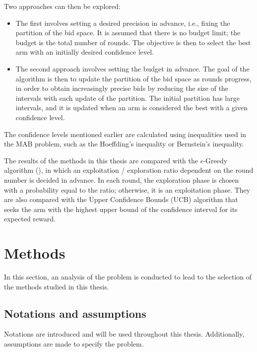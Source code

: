 \documentclass{statsmsc}
\begin{document}
Two approaches can then be explored:
\begin{itemize}
    \item The first involves setting a desired precision in advance, i.e., fixing the partition of the bid space. It is assumed that there is no budget limit; the budget is the total number of rounds. The objective is then to select the best arm with an initially desired confidence level.
    \item The second approach involves setting the budget in advance. The goal of the algorithm is then to update the partition of the bid space as rounds progress, in order to obtain increasingly precise bids by reducing the size of the intervals with each update of the partition. The initial partition has large intervals, and it is updated when an arm is considered the best with a given confidence level.
\end{itemize}

The confidence levels mentioned earlier are calculated using inequalities used in the MAB problem, such as the Hoeffding's inequality or Bernstein's inequality.

The results of the methods in this thesis are compared with the $\epsilon$-Greedy algorithm (\cite{Sutton1998}), in which an exploitation / exploration ratio dependent on the round number is decided in advance. In each round, the exploration phase is chosen with a probability equal to the ratio; otherwise, it is an exploitation phase. They are also compared with the Upper Confidence Bounds (UCB) algorithm that seeks the arm with the highest upper bound of the confidence interval for its expected reward.

\section{Methods}\label{sec:methods}

In this section, an analysis of the problem is conducted to lead to the selection of the methods studied in this thesis.

\subsection{Notations and assumptions}\label{subsec:notation_assumptions}

Notations are introduced and will be used throughout this thesis. Additionally, assumptions are made to specify the problem.
\end{document}
